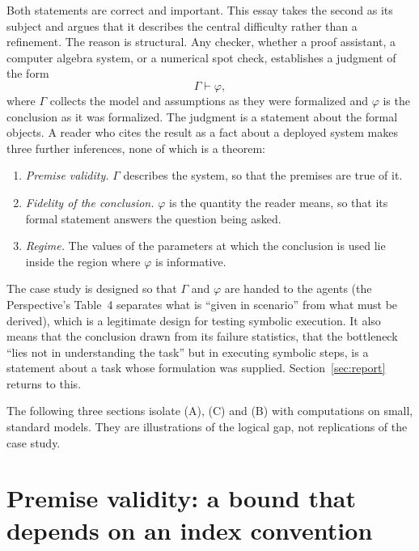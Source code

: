 \documentclass[11pt]{article}
\theoremstyle{definition}
\begin{document}
Both statements are correct and important. This essay takes the second as its subject and argues that it describes the central difficulty rather than a refinement. The reason is structural. Any checker, whether a proof assistant, a computer algebra system, or a numerical spot check, establishes a judgment of the form
\begin{equation}
\Gamma \vdash \varphi,
\label{eq:judgment}
\end{equation}
where $\Gamma$ collects the model and assumptions as they were formalized and $\varphi$ is the conclusion as it was formalized. The judgment is a statement about the formal objects. A reader who cites the result as a fact about a deployed system makes three further inferences, none of which is a theorem:
\begin{enumerate}
\item[(A)] \emph{Premise validity.} $\Gamma$ describes the system, so that the premises are true of it.
\item[(B)] \emph{Fidelity of the conclusion.} $\varphi$ is the quantity the reader means, so that its formal statement answers the question being asked.
\item[(C)] \emph{Regime.} The values of the parameters at which the conclusion is used lie inside the region where $\varphi$ is informative.
\end{enumerate}
The case study is designed so that $\Gamma$ and $\varphi$ are handed to the agents (the Perspective's Table~4 separates what is ``given in scenario'' from what must be derived), which is a legitimate design for testing symbolic execution. It also means that the conclusion drawn from its failure statistics, that the bottleneck ``lies not in understanding the task'' but in executing symbolic steps, is a statement about a task whose formulation was supplied. Section~\ref{sec:report} returns to this.

The following three sections isolate (A), (C) and (B) with computations on small, standard models. They are illustrations of the logical gap, not replications of the case study.

\section{Premise validity: a bound that depends on an index convention}
\end{document}
